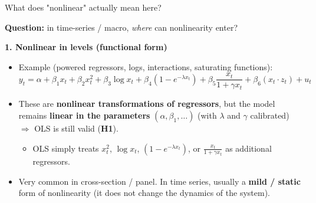 \documentclass{beamer}
\begin{document}
\begin{frame}{What does "nonlinear" actually mean here?}
\small

\textbf{Question:} in time-series / macro, \emph{where} can nonlinearity enter?

\medskip
\pause
\textbf{1. Nonlinear in levels (functional form)}
\begin{itemize}

  \item Example (powered regressors, logs, interactions, saturating functions):
\[
    y_t = \alpha
          + \beta_1 x_t + \beta_2 x_t^2
          + \beta_3 \log x_t
          + \beta_4 (1 - e^{-\lambda x_t})
          + \beta_5 \frac{x_t}{1+\gamma x_t}
          + \beta_6 (x_t \cdot z_t)
          + u_t
  \]

  \item These are \textbf{nonlinear transformations of regressors}, but the model
        remains \textbf{linear in the parameters} $(\alpha,\beta_1,\dots)$ (with $\lambda$ and $\gamma$ calibrated) $\Rightarrow$ OLS is still valid (\textbf{H1}).
        \begin{itemize}
            \item OLS simply treats $x_t^2$, $\log x_t$, $(1-e^{-\lambda x_t})$,  or $\tfrac{x_t}{1+\gamma x_t}$ as additional regressors.
        \end{itemize}

  \item Very common in cross-section / panel.  
        In time series, usually a \textbf{mild / static} form of nonlinearity
        (it does not change the dynamics of the system).

\end{itemize}

\end{frame}
\end{document}
